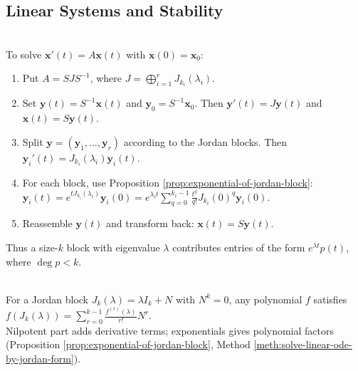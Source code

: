 \subsection{Linear Systems and Stability}

\begin{method} \label{meth:solve-linear-ode-by-jordan-form} \\
To solve $\mathbf{x}'(t)=A\mathbf{x}(t)$ with $\mathbf{x}(0)=\mathbf{x}_0$:
\begin{enumerate}[label=(\roman*)]
\setlength{\itemsep}{0pt}
\item Put $A=SJS^{-1}$, where $J=\bigoplus_{i=1}^rJ_{k_i}(\lambda_i)$.
\item Set $\mathbf{y}(t)=S^{-1}\mathbf{x}(t)$ and $\mathbf{y}_0=S^{-1}\mathbf{x}_0$. Then $\mathbf{y}'(t)=J\mathbf{y}(t)$ and $\mathbf{x}(t)=S\mathbf{y}(t)$.
\item Split $\mathbf{y}=(\mathbf{y}_1,\ldots,\mathbf{y}_r)$ according to the Jordan blocks. Then $\mathbf{y}_i'(t)=J_{k_i}(\lambda_i)\mathbf{y}_i(t)$.
\item For each block, use Proposition \ref{prop:exponential-of-jordan-block}: $\mathbf{y}_i(t) =e^{tJ_{k_i}(\lambda_i)}\mathbf{y}_i(0) =e^{\lambda_i t}\sum\limits_{q=0}^{k_i-1}\frac{t^q}{q!}J_{k_i}(0)^q\mathbf{y}_i(0)$.
\item Reassemble $\mathbf{y}(t)$ and transform back: $\mathbf{x}(t)=S\mathbf{y}(t)$.
\end{enumerate}
Thus a size-$k$ block with eigenvalue $\lambda$ contributes entries of the form $e^{\lambda t}p(t)$, where $\deg p<k$.
\end{method}

\begin{perspective} \label{per:jordan-functions-polynomial-factors} \\
For a Jordan block $J_k(\lambda)=\lambda I_k+N$ with $N^k=0$, any polynomial $f$ satisfies $f(J_k(\lambda))=\sum\limits_{r=0}^{k-1}\frac{f^{(r)}(\lambda)}{r!}N^r$.\\
Nilpotent part adds derivative terms; exponentials gives polynomial factors (Proposition \ref{prop:exponential-of-jordan-block}, Method \ref{meth:solve-linear-ode-by-jordan-form}).
\end{perspective}

